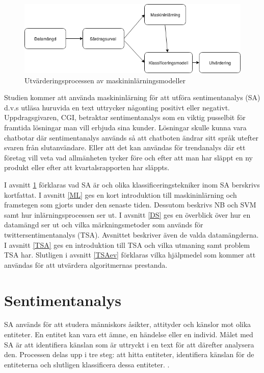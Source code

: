 \documentclass{kaumasters} %
\begin{document}
\begin{figure}[h]
\includegraphics[width=12cm]{oversiktsfigur}
\centering
\caption{Utvärderingsprocessen av maskininlärningsmodeller}
\label{fig:overfig}
\end{figure}

Studien kommer att använda maskininlärning för att utföra sentimentanalys (SA) d.v.s utläsa huruvida en text uttrycker någonting positivt eller negativt. Uppdragsgivaren, CGI, betraktar sentimentanalys  som en viktig pusselbit för framtida lösningar man vill erbjuda sina kunder. Lösningar skulle kunna vara chatbotar där sentimentanalys används så att chatboten ändrar sitt språk utefter svaren från slutanvändare. Eller att det kan användas för trendanalys där ett företag vill veta vad allmänheten tycker före och efter att man har släppt en ny produkt eller efter att kvartalsrapporten har släppts.

I avsnitt \ref{SA} förklaras vad SA är och olika klassificeringstekniker inom SA berskrivs kortfattat. I avsnitt \ref{ML} ges en kort introduktion till maskininlärning och framstegen som gjorts under den senaste tiden. Dessutom beskrivs NB och SVM samt hur inlärningsprocessen ser ut. I avsnitt \ref{DS} ges en överblick över hur en datamängd ser ut och vilka märkningsmetoder som används för twittersentimentanalys (TSA). Avsnittet beskriver även de valda datamängderna. I avsnitt \ref{TSA} ges en introduktion till TSA och vilka utmaning samt problem TSA har. Slutligen i avsnitt \ref{TSAev} förklaras vilka hjälpmedel som kommer att användas för att utvärdera algoritmernas prestanda.


\section{Sentimentanalys} \label{SA}
SA används för att studera människors åsikter, attityder och känslor mot olika entiteter. En entitet kan vara ett ämne, en händelse eller en individ. Målet med SA är att identifiera känslan som är uttryckt i en text för att därefter analysera den. Processen delas upp i tre steg: att hitta entiteter, identifiera känslan för de entiteterna och slutligen klassificera dessa entiteter. \cite{SAsurvey}.
\end{document}

